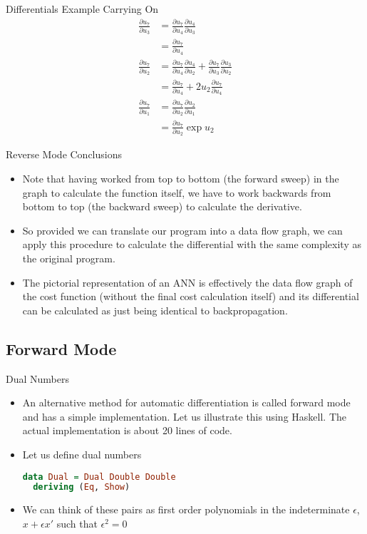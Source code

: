 \documentclass{beamer}
\begin{document}
\begin{frame}[fragile]{Differentials Example Carrying On}
$$
\begin{aligned}
\frac{\partial u_7}{\partial u_3} &=
 \frac{\partial u_7}{\partial u_4}\frac{\partial u_4}{\partial u_3} \\
&= \frac{\partial u_7}{\partial u_4} \\
\frac{\partial u_7}{\partial u_2} &=
 \frac{\partial u_7}{\partial u_4}\frac{\partial u_4}{\partial u_2} +
 \frac{\partial u_7}{\partial u_3}\frac{\partial u_3}{\partial u_2} \\
&= \frac{\partial u_7}{\partial u_4} + 2u_2\frac{\partial u_7}{\partial u_4} \\
\frac{\partial u_7}{\partial u_1} &=
 \frac{\partial u_7}{\partial u_2}\frac{\partial u_2}{\partial u_1} \\
&=\frac{\partial u_7}{\partial u_2}\exp{u_2}
\end{aligned}
$$
\end{frame}

\begin{frame}[fragile]{Reverse Mode Conclusions}
\begin{itemize}
\item
Note that having worked from top to bottom (the forward sweep) in the
graph to calculate the function itself, we have to work backwards from
bottom to top (the backward sweep) to calculate the derivative.
\item
So provided we can translate our program into a data flow graph, we can
apply this procedure to calculate the differential with the same
complexity as the original program.
\item
The pictorial representation of an ANN is effectively the data flow
graph of the cost function (without the final cost calculation itself)
and its differential can be calculated as just being identical to
backpropagation.
\end{itemize}
\end{frame}

\subsection{Forward Mode}

\begin{frame}[fragile]{Dual Numbers}
\begin{itemize}
\item
An alternative method for automatic differentiation is called forward
mode and has a simple implementation. Let us illustrate this using
Haskell. The actual implementation is about 20 lines of code.
\item
Let us define dual numbers

\begin{lstlisting}[language=Haskell]
data Dual = Dual Double Double
  deriving (Eq, Show)
\end{lstlisting}
\item
We can think of these pairs as first order polynomials in the
indeterminate $\epsilon$, $x + \epsilon x'$ such that $\epsilon^2 = 0$
\end{itemize}
\end{frame}
\end{document}
